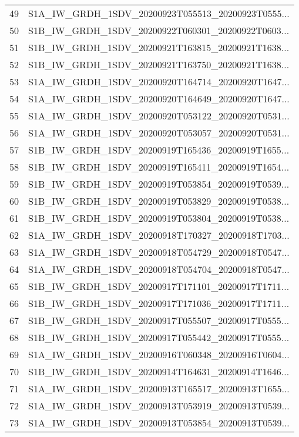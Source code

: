 \begin{tabular}{ll}
49  &  S1A\_IW\_GRDH\_1SDV\_20200923T055513\_20200923T0555... \\
50  &  S1B\_IW\_GRDH\_1SDV\_20200922T060301\_20200922T0603... \\
51  &  S1B\_IW\_GRDH\_1SDV\_20200921T163815\_20200921T1638... \\
52  &  S1B\_IW\_GRDH\_1SDV\_20200921T163750\_20200921T1638... \\
53  &  S1A\_IW\_GRDH\_1SDV\_20200920T164714\_20200920T1647... \\
54  &  S1A\_IW\_GRDH\_1SDV\_20200920T164649\_20200920T1647... \\
55  &  S1A\_IW\_GRDH\_1SDV\_20200920T053122\_20200920T0531... \\
56  &  S1A\_IW\_GRDH\_1SDV\_20200920T053057\_20200920T0531... \\
57  &  S1B\_IW\_GRDH\_1SDV\_20200919T165436\_20200919T1655... \\
58  &  S1B\_IW\_GRDH\_1SDV\_20200919T165411\_20200919T1654... \\
59  &  S1B\_IW\_GRDH\_1SDV\_20200919T053854\_20200919T0539... \\
60  &  S1B\_IW\_GRDH\_1SDV\_20200919T053829\_20200919T0538... \\
61  &  S1B\_IW\_GRDH\_1SDV\_20200919T053804\_20200919T0538... \\
62  &  S1A\_IW\_GRDH\_1SDV\_20200918T170327\_20200918T1703... \\
63  &  S1A\_IW\_GRDH\_1SDV\_20200918T054729\_20200918T0547... \\
64  &  S1A\_IW\_GRDH\_1SDV\_20200918T054704\_20200918T0547... \\
65  &  S1B\_IW\_GRDH\_1SDV\_20200917T171101\_20200917T1711... \\
66  &  S1B\_IW\_GRDH\_1SDV\_20200917T171036\_20200917T1711... \\
67  &  S1B\_IW\_GRDH\_1SDV\_20200917T055507\_20200917T0555... \\
68  &  S1B\_IW\_GRDH\_1SDV\_20200917T055442\_20200917T0555... \\
69  &  S1A\_IW\_GRDH\_1SDV\_20200916T060348\_20200916T0604... \\
70  &  S1B\_IW\_GRDH\_1SDV\_20200914T164631\_20200914T1646... \\
71  &  S1A\_IW\_GRDH\_1SDV\_20200913T165517\_20200913T1655... \\
72  &  S1A\_IW\_GRDH\_1SDV\_20200913T053919\_20200913T0539... \\
73  &  S1A\_IW\_GRDH\_1SDV\_20200913T053854\_20200913T0539... \\

\end{tabular}

